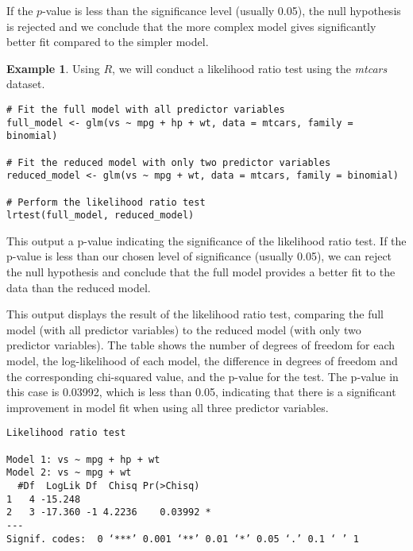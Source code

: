 \documentclass{article}[12pt]
\theoremstyle{definition}
\newtheorem{exmp}{Example}[section]
\begin{document}
\noindent
If the $p$-value is less than the significance level (usually 0.05), the null hypothesis is rejected and we conclude that the more complex model gives significantly better fit compared to the simpler model. 

\bigskip

\begin{exmp}
    Using $R$, we will conduct a likelihood ratio test using the \emph{mtcars} dataset. 
\end{exmp}

\medskip

\begin{verbatim}
# Fit the full model with all predictor variables
full_model <- glm(vs ~ mpg + hp + wt, data = mtcars, family = binomial)

# Fit the reduced model with only two predictor variables
reduced_model <- glm(vs ~ mpg + wt, data = mtcars, family = binomial)

# Perform the likelihood ratio test
lrtest(full_model, reduced_model)
\end{verbatim}

\bigskip

\noindent
This output a p-value indicating the significance of the likelihood ratio test. If the p-value is less than our chosen level of significance (usually 0.05), we can reject the null hypothesis and conclude that the full model provides a better fit to the data than the reduced model.

\newpage

\bigskip

\noindent
This output displays the result of the likelihood ratio test, comparing the full model (with all predictor variables) to the reduced model (with only two predictor variables). The table shows the number of degrees of freedom for each model, the log-likelihood of each model, the difference in degrees of freedom and the corresponding chi-squared value, and the p-value for the test. The p-value in this case is 0.03992, which is less than 0.05, indicating that there is a significant improvement in model fit when using all three predictor variables.

\bigskip

\begin{verbatim}
Likelihood ratio test

Model 1: vs ~ mpg + hp + wt
Model 2: vs ~ mpg + wt
  #Df  LogLik Df  Chisq Pr(>Chisq)
1   4 -15.248
2   3 -17.360 -1 4.2236    0.03992 *
---
Signif. codes:  0 ‘***’ 0.001 ‘**’ 0.01 ‘*’ 0.05 ‘.’ 0.1 ‘ ’ 1

\end{verbatim}
\end{document}
